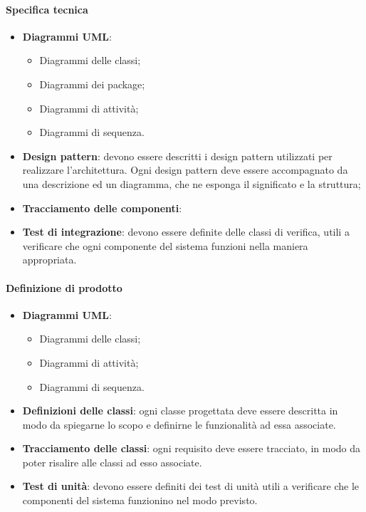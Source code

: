  \paragraph{Specifica tecnica}
\begin{itemize} 
	\item \textbf{Diagrammi UML}:
	\begin{itemize}
	\item Diagrammi delle classi;
	\item Diagrammi dei package;
	\item Diagrammi di attività;
	\item Diagrammi di sequenza.
	\end{itemize}
	\item \textbf{Design pattern}: devono essere descritti i design pattern utilizzati per realizzare l'architettura. Ogni design
pattern deve essere accompagnato da una descrizione ed un diagramma, che ne esponga il
significato e la struttura;
	\item \textbf{Tracciamento delle componenti}:
	\item \textbf{Test di integrazione}: devono essere definite delle classi di verifica, utili a verificare che ogni componente del
sistema funzioni nella maniera appropriata.
\end{itemize}
 \paragraph{Definizione di prodotto}
\begin{itemize}
	\item \textbf{Diagrammi UML}:
	\begin{itemize}
		\item Diagrammi delle classi;
		\item Diagrammi di attività;
		\item Diagrammi di sequenza.
	\end{itemize}
	\item \textbf{Definizioni delle classi}: ogni classe progettata deve essere descritta in modo da spiegarne lo scopo e definirne le
funzionalità ad essa associate.
	\item \textbf{Tracciamento delle classi}: ogni requisito deve essere tracciato, in modo da poter risalire alle classi ad esso associate. 
	\item \textbf{Test di unità}: devono essere definiti dei test di unità utili a verificare che le componenti del sistema funzionino nel modo previsto.
\end{itemize}

